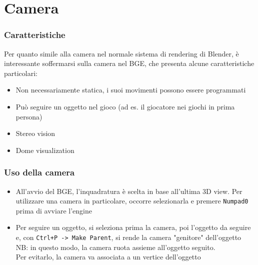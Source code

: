 \documentclass{beamer}
\def\code#1{\texttt{#1}}
\begin{document}
	\section{Camera}
	\begin{frame}
	\frametitle{Caratteristiche}
		Per quanto simile alla camera nel normale sistema di rendering di Blender, è interessante soffermarsi sulla camera nel BGE, che presenta alcune caratteristiche particolari:
		\begin{itemize}
			\item Non necessariamente statica, i suoi movimenti possono essere programmati
			\item Può seguire un oggetto nel gioco (ad es. il giocatore nei giochi in prima persona)
			\item Stereo vision
			\item Dome visualization
		\end{itemize}
	\end{frame}	
	\begin{frame}
	\frametitle{Uso della camera}
	\begin{itemize}
		\item All'avvio del BGE, l'inquadratura è scelta in base all'ultima 3D view. Per utilizzare una camera in particolare, occorre selezionarla e premere \code{Numpad0} prima di avviare l'engine
		\item Per seguire un oggetto, si seleziona prima la camera, poi l'oggetto da seguire e, con \code{Ctrl+P -> Make Parent}, si rende la camera "genitore" dell'oggetto \\ {\footnotesize \hspace{1em} NB: in questo modo, la camera ruota assieme all'oggetto seguito. \\ \hspace{1em} Per evitarlo, la camera va associata a un vertice dell'oggetto}
	\end{itemize}
	\end{frame}
\end{document}
